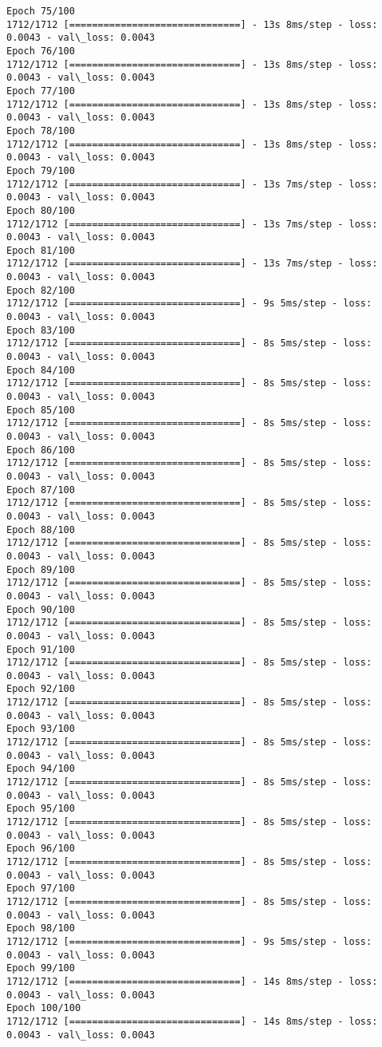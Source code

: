 \documentclass[11pt]{article}
\begin{document}
\begin{Verbatim}[commandchars=\\\{\}]
Epoch 75/100
1712/1712 [==============================] - 13s 8ms/step - loss: 0.0043 - val\_loss: 0.0043
Epoch 76/100
1712/1712 [==============================] - 13s 8ms/step - loss: 0.0043 - val\_loss: 0.0043
Epoch 77/100
1712/1712 [==============================] - 13s 8ms/step - loss: 0.0043 - val\_loss: 0.0043
Epoch 78/100
1712/1712 [==============================] - 13s 8ms/step - loss: 0.0043 - val\_loss: 0.0043
Epoch 79/100
1712/1712 [==============================] - 13s 7ms/step - loss: 0.0043 - val\_loss: 0.0043
Epoch 80/100
1712/1712 [==============================] - 13s 7ms/step - loss: 0.0043 - val\_loss: 0.0043
Epoch 81/100
1712/1712 [==============================] - 13s 7ms/step - loss: 0.0043 - val\_loss: 0.0043
Epoch 82/100
1712/1712 [==============================] - 9s 5ms/step - loss: 0.0043 - val\_loss: 0.0043
Epoch 83/100
1712/1712 [==============================] - 8s 5ms/step - loss: 0.0043 - val\_loss: 0.0043
Epoch 84/100
1712/1712 [==============================] - 8s 5ms/step - loss: 0.0043 - val\_loss: 0.0043
Epoch 85/100
1712/1712 [==============================] - 8s 5ms/step - loss: 0.0043 - val\_loss: 0.0043
Epoch 86/100
1712/1712 [==============================] - 8s 5ms/step - loss: 0.0043 - val\_loss: 0.0043
Epoch 87/100
1712/1712 [==============================] - 8s 5ms/step - loss: 0.0043 - val\_loss: 0.0043
Epoch 88/100
1712/1712 [==============================] - 8s 5ms/step - loss: 0.0043 - val\_loss: 0.0043
Epoch 89/100
1712/1712 [==============================] - 8s 5ms/step - loss: 0.0043 - val\_loss: 0.0043
Epoch 90/100
1712/1712 [==============================] - 8s 5ms/step - loss: 0.0043 - val\_loss: 0.0043
Epoch 91/100
1712/1712 [==============================] - 8s 5ms/step - loss: 0.0043 - val\_loss: 0.0043
Epoch 92/100
1712/1712 [==============================] - 8s 5ms/step - loss: 0.0043 - val\_loss: 0.0043
Epoch 93/100
1712/1712 [==============================] - 8s 5ms/step - loss: 0.0043 - val\_loss: 0.0043
Epoch 94/100
1712/1712 [==============================] - 8s 5ms/step - loss: 0.0043 - val\_loss: 0.0043
Epoch 95/100
1712/1712 [==============================] - 8s 5ms/step - loss: 0.0043 - val\_loss: 0.0043
Epoch 96/100
1712/1712 [==============================] - 8s 5ms/step - loss: 0.0043 - val\_loss: 0.0043
Epoch 97/100
1712/1712 [==============================] - 8s 5ms/step - loss: 0.0043 - val\_loss: 0.0043
Epoch 98/100
1712/1712 [==============================] - 9s 5ms/step - loss: 0.0043 - val\_loss: 0.0043
Epoch 99/100
1712/1712 [==============================] - 14s 8ms/step - loss: 0.0043 - val\_loss: 0.0043
Epoch 100/100
1712/1712 [==============================] - 14s 8ms/step - loss: 0.0043 - val\_loss: 0.0043

    \end{Verbatim}
\end{document}
